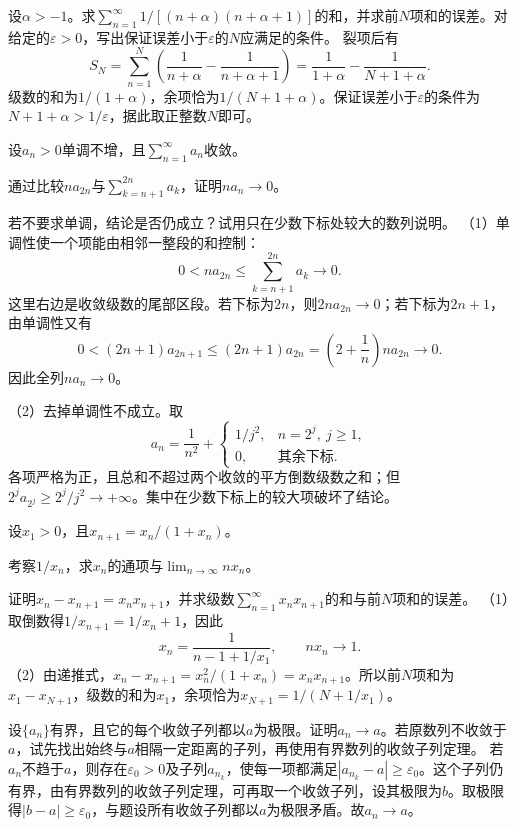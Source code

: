 设\(\alpha>-1\)。求\(\sum_{n=1}^{\infty}1/[(n+\alpha)(n+\alpha+1)]\)的和，并求前\(N\)项和的误差。对给定的\(\varepsilon>0\)，写出保证误差小于\(\varepsilon\)的\(N\)应满足的条件。
\solutionanswer
裂项后有
\[
S_N=\sum_{n=1}^N\left(\frac1{n+\alpha}-\frac1{n+\alpha+1}\right)
=\frac1{1+\alpha}-\frac1{N+1+\alpha}.
\]
级数的和为\(1/(1+\alpha)\)，余项恰为\(1/(N+1+\alpha)\)。保证误差小于\(\varepsilon\)的条件为\(N+1+\alpha>1/\varepsilon\)，据此取正整数\(N\)即可。


设\(a_n>0\)单调不增，且\(\sum_{n=1}^{\infty}a_n\)收敛。

\quad {}通过比较\(na_{2n}\)与\(\sum_{k=n+1}^{2n}a_k\)，证明\(na_n\to0\)。

\quad {}若不要求单调，结论是否仍成立？试用只在少数下标处较大的数列说明。
\solutionanswer
（1）单调性使一个项能由相邻一整段的和控制：
\[
0<na_{2n}\le\sum_{k=n+1}^{2n}a_k\to0.
\]
这里右边是收敛级数的尾部区段。若下标为\(2n\)，则\(2na_{2n}\to0\)；若下标为\(2n+1\)，由单调性又有
\[
0<(2n+1)a_{2n+1}\le(2n+1)a_{2n}
=\left(2+\frac1n\right)na_{2n}\to0.
\]
因此全列\(na_n\to0\)。

（2）去掉单调性不成立。取
\[
a_n=\frac1{n^2}+\begin{cases}1/j^2,&n=2^j,\ j\ge1,\\0,&\text{其余下标}.\end{cases}
\]
各项严格为正，且总和不超过两个收敛的平方倒数级数之和；但\(2^ja_{2^j}\ge2^j/j^2\to+\infty\)。集中在少数下标上的较大项破坏了结论。


设\(x_1>0\)，且\(x_{n+1}=x_n/(1+x_n)\)。

\quad {}考察\(1/x_n\)，求\(x_n\)的通项与\(\lim_{n\to\infty}nx_n\)。

\quad {}证明\(x_n-x_{n+1}=x_nx_{n+1}\)，并求级数\(\sum_{n=1}^{\infty}x_nx_{n+1}\)的和与前\(N\)项和的误差。
\solutionanswer
（1）取倒数得\(1/x_{n+1}=1/x_n+1\)，因此
\[
x_n=\frac1{n-1+1/x_1},\qquad nx_n\to1.
\]
（2）由递推式，\(x_n-x_{n+1}=x_n^2/(1+x_n)=x_nx_{n+1}\)。所以前\(N\)项和为\(x_1-x_{N+1}\)，级数的和为\(x_1\)，余项恰为\(x_{N+1}=1/(N+1/x_1)\)。


设\(\{a_n\}\)有界，且它的每个收敛子列都以\(a\)为极限。证明\(a_n\to a\)。若原数列不收敛于\(a\)，试先找出始终与\(a\)相隔一定距离的子列，再使用有界数列的收敛子列定理。
\solutionanswer
若\(a_n\)不趋于\(a\)，则存在\(\varepsilon_0>0\)及子列\(a_{n_k}\)，使每一项都满足\(|a_{n_k}-a|\ge\varepsilon_0\)。这个子列仍有界，由有界数列的收敛子列定理，可再取一个收敛子列，设其极限为\(b\)。取极限得\(|b-a|\ge\varepsilon_0\)，与题设所有收敛子列都以\(a\)为极限矛盾。故\(a_n\to a\)。


